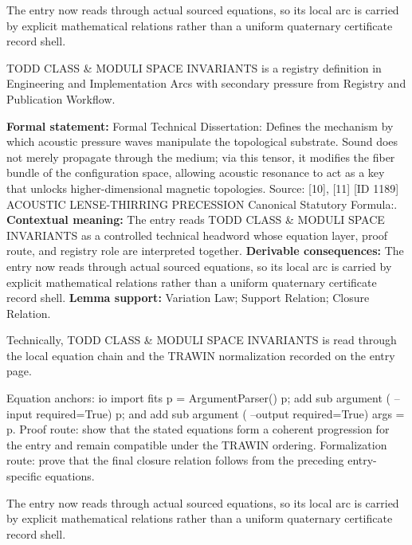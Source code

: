 The entry now reads through actual sourced equations, so its local arc is carried by explicit mathematical relations rather than a uniform quaternary certificate record shell.
\clearpage


\begingroup\small
{}
TODD CLASS \& MODULI SPACE INVARIANTS is a registry definition in Engineering and Implementation Arcs with secondary pressure from Registry and Publication Workflow.

\begingroup\footnotesize\setlength{\emergencystretch}{3em}\sloppy
\textbf{Formal statement:} Formal Technical Dissertation: Defines the mechanism by which acoustic pressure waves manipulate the topological substrate. Sound does not merely propagate through the medium; via this tensor, it modifies the fiber bundle of the configuration space, allowing acoustic resonance to act as a key that unlocks higher-dimensional magnetic topologies. Source: [10], [11] [ID 1189] ACOUSTIC LENSE-THIRRING PRECESSION Canonical Statutory Formula:. \textbf{Contextual meaning:} The entry reads TODD CLASS \& MODULI SPACE INVARIANTS as a controlled technical headword whose equation layer, proof route, and registry role are interpreted together. \textbf{Derivable consequences:} The entry now reads through actual sourced equations, so its local arc is carried by explicit mathematical relations rather than a uniform quaternary certificate record shell. \textbf{Lemma support:} Variation Law; Support Relation; Closure Relation.\par
\endgroup

Technically, TODD CLASS \& MODULI SPACE INVARIANTS is read through the local equation chain and the TRAWIN normalization recorded on the entry page.

Equation anchors: io import fits p = ArgumentParser() p; add sub argument ( --input required=True) p; and add sub argument ( --output required=True) args = p. Proof route: show that the stated equations form a coherent progression for the entry and remain compatible under the TRAWIN ordering. Formalization route: prove that the final closure relation follows from the preceding entry-specific equations.

The entry now reads through actual sourced equations, so its local arc is carried by explicit mathematical relations rather than a uniform quaternary certificate record shell.
\endgroup

